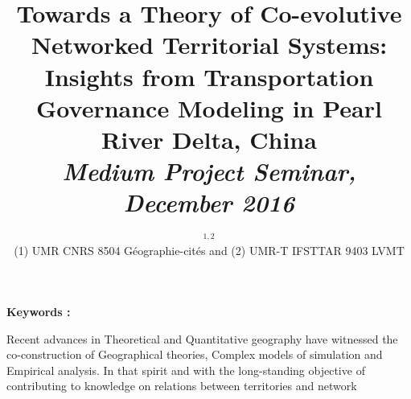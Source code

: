 


\title{Towards a Theory of Co-evolutive Networked Territorial Systems: Insights from Transportation Governance Modeling in Pearl River Delta, China\\\bigskip
\bigskip
\bigskip
\textit{Medium Project Seminar, December 2016}
}\bigskip
\bigskip
\author{$^{1,2}$\\
\small(1) UMR CNRS 8504 Géographie-cités and (2) UMR-T IFSTTAR 9403 LVMT
}
\date{}

\maketitle

\justify




\vspace{1cm}

\textbf{Keywords : }\textit{}

\vspace{1.5cm}

Recent advances in Theoretical and Quantitative geography have witnessed the co-construction of Geographical theories, Complex models of simulation and Empirical analysis. In that spirit and with the long-standing objective of contributing to knowledge on relations between territories and network










%
%



